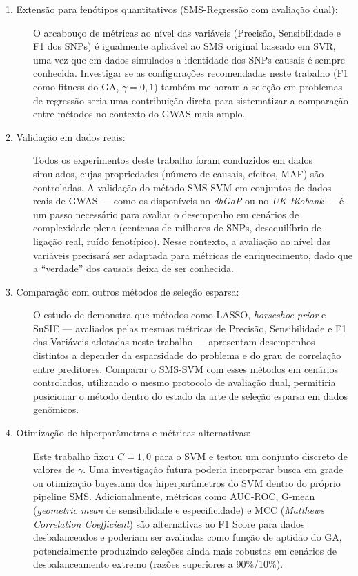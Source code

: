 \documentclass[
    12pt,
    a4paper,
    oneside,
    english,
    french,
    spanish,
    brazil
    ]{abntex2}
\newcommand{\novo}[1]{\textcolor{corNova}{#1}}
\begin{document}
\begin{description}

  \item[\novo{1. Extensão para fenótipos quantitativos (SMS-Regressão com avaliação dual):}]
  \novo{O arcabouço de métricas ao nível das variáveis (Precisão, Sensibilidade e F1 dos SNPs) é igualmente aplicável ao SMS original baseado em SVR, uma vez que em dados simulados a identidade dos SNPs causais é sempre conhecida. Investigar se as configurações recomendadas neste trabalho (F1 como fitness do GA, $\gamma = 0{,}1$) também melhoram a seleção em problemas de regressão seria uma contribuição direta para sistematizar a comparação entre métodos no contexto do GWAS mais amplo.}

  \item[\novo{2. Validação em dados reais:}]
  \novo{Todos os experimentos deste trabalho foram conduzidos em dados simulados, cujas propriedades (número de causais, efeitos, MAF) são controladas. A validação do método SMS-SVM em conjuntos de dados reais de GWAS --- como os disponíveis no \textit{dbGaP} ou no \textit{UK Biobank} --- é um passo necessário para avaliar o desempenho em cenários de complexidade plena (centenas de milhares de SNPs, desequilíbrio de ligação real, ruído fenotípico). Nesse contexto, a avaliação ao nível das variáveis precisará ser adaptada para métricas de enriquecimento, dado que a ``verdade'' dos causais deixa de ser conhecida.}

  \item[\novo{3. Comparação com outros métodos de seleção esparsa:}]
  \novo{O estudo de  demonstra que métodos como LASSO, \textit{horseshoe prior} e SuSIE --- avaliados pelas mesmas métricas de Precisão, Sensibilidade e F1 das Variáveis adotadas neste trabalho --- apresentam desempenhos distintos a depender da esparsidade do problema e do grau de correlação entre preditores. Comparar o SMS-SVM com esses métodos em cenários controlados, utilizando o mesmo protocolo de avaliação dual, permitiria posicionar o método dentro do estado da arte de seleção esparsa em dados genômicos.}

  \item[\novo{4. Otimização de hiperparâmetros e métricas alternativas:}]
  \novo{Este trabalho fixou $C = 1{,}0$ para o SVM e testou um conjunto discreto de valores de $\gamma$. Uma investigação futura poderia incorporar busca em grade ou otimização bayesiana dos hiperparâmetros do SVM dentro do próprio pipeline SMS. Adicionalmente, métricas como AUC-ROC, G-mean (\textit{geometric mean} de sensibilidade e especificidade) e MCC (\textit{Matthews Correlation Coefficient}) são alternativas ao F1 Score para dados desbalanceados e poderiam ser avaliadas como função de aptidão do GA, potencialmente produzindo seleções ainda mais robustas em cenários de desbalanceamento extremo (razões superiores a 90\%/10\%).}


\end{description}
\end{document}
